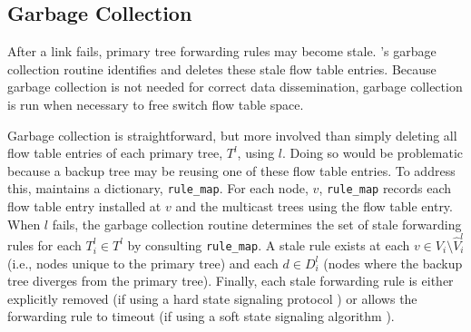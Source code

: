 \subsection{Garbage Collection}
\label{subsec:garbage}

After a link fails, primary tree forwarding rules may become stale. \mdrs's garbage collection routine identifies and deletes these stale flow table entries. 
Because garbage collection is not needed for correct data dissemination, garbage collection is run when necessary to free switch flow table space. 

Garbage collection is straightforward, but more involved than simply deleting all flow table entries of each primary tree, $T^l$, using $l$.  Doing so would be problematic 
because a backup tree may be reusing one of these flow table entries.  To address this, \mdr maintains a dictionary, {\tt rule\_map}.  For each node, $v$, {\tt rule\_map} records
each flow table entry installed at $v$ and the multicast trees using the flow table entry. %
When $l$ fails, the garbage collection routine determines the set of stale forwarding rules for each $T^l_i \in T^l$ by consulting  {\tt rule\_map}.
A stale rule exists at each $v \in V_i \setminus \hat{V}_i^l$ (i.e., nodes unique to the primary tree) and each $d \in D_i^l$ (nodes where the backup tree diverges from the primary tree).
Finally, each stale forwarding rule is either explicitly removed (if using a hard state signaling protocol \cite{Ji03}) 
or \mdr allows the forwarding rule to timeout (if using a soft state signaling algorithm \cite{Clark88}).



